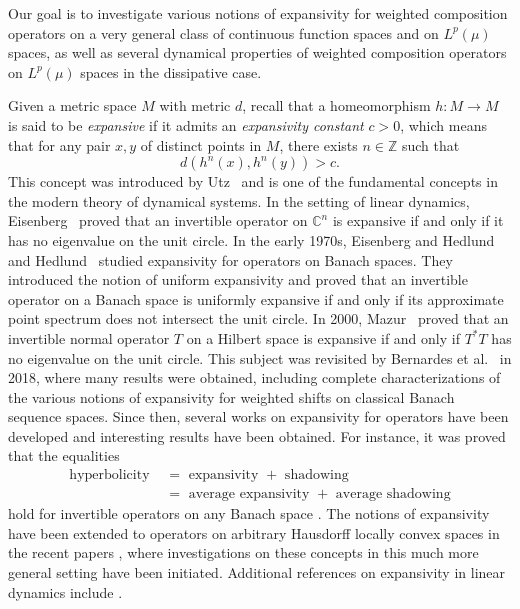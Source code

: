 \documentclass[12pt]{article}
\theoremstyle{plain}
\theoremstyle{definition}
\newcommand{\Z}{\mathbb{Z}} %
\newcommand{\C}{\mathbb{C}} %
\begin{document}
Our goal is to investigate various notions of expansivity for weighted composition operators on a very general class of 
continuous function spaces and on $L^p(\mu)$ spaces, as well as several dynamical properties of 
weighted composition operators on $L^p(\mu)$ spaces in the dissipative case.

Given a metric space $M$ with metric $d$, recall that a homeomorphism $h : M \to M$ is said to be {\em expansive} if it admits an {\em expansivity constant} $c > 0$, which means that for any pair $x,y$ of distinct points in $M$, there exists $n \in \Z$ such that
\[
d(h^n(x),h^n(y)) > c.
\]
This concept was introduced by Utz~\cite{WUtz50} and is one of the fundamental concepts in the modern theory of dynamical systems.
In the setting of linear dynamics, Eisenberg~\cite{MEis66} proved that an invertible operator on $\C^n$ is expansive if and only if it has no eigenvalue on the unit circle. 
In the early 1970s, Eisenberg and Hedlund~\cite{MEisJHed70} and Hedlund~\cite{JHed71} studied expansivity for operators on Banach spaces. 
They introduced the notion of uniform expansivity and proved that an invertible operator on a Banach space is uniformly expansive if and only if its approximate point spectrum does not intersect the unit circle. 
In 2000, Mazur~\cite{MMaz00} proved that an invertible normal operator $T$ on a Hilbert space is expansive if and only if $T^*T$ has no eigenvalue on the unit circle. 
This subject was revisited by Bernardes et al.~\cite{BerCirDarMesPuj18} in 2018, where many results were obtained, including complete characterizations of the various notions of expansivity for weighted shifts on classical Banach sequence spaces.
Since then, several works on expansivity for operators have been developed and interesting results have been obtained.
For instance, it was proved that the equalities
\begin{align*}
\text{hyperbolicity } &= \text{ expansivity } + \text{ shadowing}\\
  &= \text{ average expansivity } + \text{ average shadowing}
\end{align*}
hold for invertible operators on any Banach space \cite{AlvBerMes21,NBerAMes21,CirGolPuj21}.
The notions of expansivity have been extended to operators on arbitrary Hausdorff locally convex spaces in the recent papers \cite{BerCarDarFavPer25,BerMarRod}, where investigations on these concepts in this much more general setting have been initiated.
Additional references on expansivity in linear dynamics include 
\cite{CAlvJHen25,BagDasOsaPod25,AniDarMai22,KLeeCMor22,MMai22}.
\end{document}

